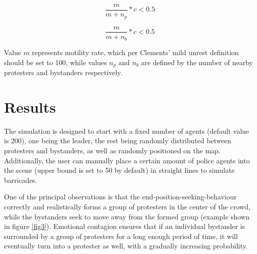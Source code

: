 \documentclass[9pt]{pnas-new}
\begin{document}
\begin{equation}
\frac{m}{m+n_p} *c < 0.5
\label{formula1}
\end{equation}

\begin{equation}
\frac{m}{m+n_b}
\label{formula2}*c < 0.5
\end{equation}

Value $m$ represents motility rate, which per Clements' mild unrest definition should be set to 100, while values $n_p$ and $n_b$ are defined by the number of nearby protesters and bystanders respectively. 

\section*{Results}

The simulation is designed to start with a fixed number of agents (default value is 200), one being the leader, the rest being randomly distributed between protesters and bystanders, as well as randomly positioned on the map. Additionally, the user can manually place a certain amount of police agents into the scene (upper bound is set to 50 by default) in straight lines to simulate barricades. 

\bigskip
One of the principal observations is that the end-position-seeking-behaviour correctly and realistically forms a group of protesters in the center of the crowd, while the bystanders seek to move away from the formed group (example shown in figure \ref{fig3}). Emotional contagion ensures that if an individual bystander is surrounded by a group of protesters for a long enough period of time, it will eventually turn into a protester as well, with a gradually increasing probability. 
\end{document}
